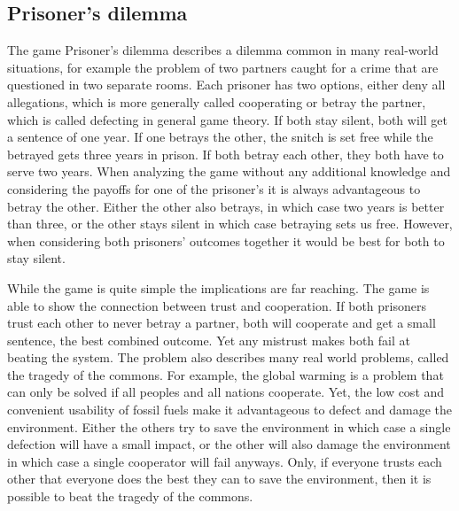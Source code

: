 \subsection{Prisoner's dilemma}
\label{sec:prisoner}
The game Prisoner's dilemma describes a dilemma common in many real-world situations, for
example the problem of two partners caught for a crime that are questioned in two separate rooms. 
Each prisoner has two options, either deny all allegations, which is more generally called cooperating
 or betray the partner, which is called defecting in general game theory. If both stay 
silent, both will get a sentence of one year. If one betrays the other, the snitch is set free while the 
betrayed gets three years in prison. If both betray each other, they both have to serve two years.
When analyzing the game without any additional knowledge and considering the payoffs for one of the
prisoner's it is always advantageous to betray the other. Either the other also betrays, in which case
two years is better than three, or the other stays silent in which case betraying sets us free. 
However, when considering both prisoners' outcomes together it would be best for both to stay silent.
\cite{rapoport1965prisoner}

While the game is quite simple the implications are far reaching. The game is able to show the 
connection between trust and cooperation. If both prisoners trust each other to never betray a 
partner, both will cooperate and get a small sentence, the best combined outcome. Yet any mistrust
makes both fail at beating the system. The problem also describes many real world problems, called 
the tragedy of the commons\cite{Hardin1243}. For example, the global warming is a problem that can only be solved if
all peoples and all nations cooperate. Yet, the low cost and convenient usability of fossil fuels 
make it advantageous to defect and damage the environment. Either the others try to save the environment
in which case a single defection will have a small impact, or the other will also damage the environment
in which case a single cooperator will fail anyways. Only, if everyone trusts each other that
everyone does the best they can to save the environment, then it is possible to beat the tragedy 
of the commons.

